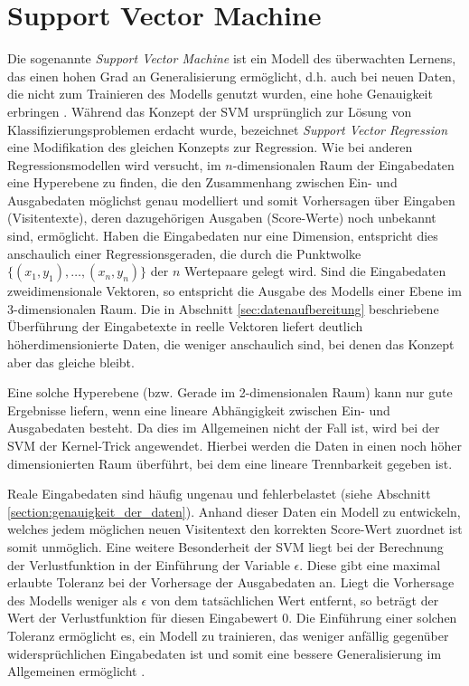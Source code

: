 \section{Support Vector Machine}
Die sogenannte \textit{Support Vector Machine} ist ein Modell des überwachten Lernens, das einen hohen Grad an Generalisierung ermöglicht, d.h. auch bei neuen Daten, die nicht zum Trainieren des Modells genutzt wurden, eine hohe Genauigkeit erbringen \citep{Awad2015}. Während das Konzept der SVM ursprünglich zur Lösung von Klassifizierungsproblemen erdacht wurde, bezeichnet \textit{Support Vector Regression} eine Modifikation des gleichen Konzepts zur Regression. Wie bei anderen Regressionsmodellen wird versucht, im $n$-dimensionalen Raum der Eingabedaten eine Hyperebene zu finden, die den Zusammenhang zwischen Ein- und Ausgabedaten möglichst genau modelliert und somit Vorhersagen über Eingaben (Visitentexte), deren dazugehörigen Ausgaben (Score-Werte) noch unbekannt sind, ermöglicht. Haben die Eingabedaten nur eine Dimension, entspricht dies anschaulich einer Regressionsgeraden, die durch die Punktwolke $\{(x_1, y_1), \dots, (x_n, y_n)\}$ der $n$ Wertepaare gelegt wird. Sind die Eingabedaten zweidimensionale Vektoren, so entspricht die Ausgabe des Modells einer Ebene im 3-dimensionalen Raum. Die in Abschnitt \ref{sec:datenaufbereitung} beschriebene Überführung der Eingabetexte in reelle Vektoren liefert deutlich höherdimensionierte Daten, die weniger anschaulich sind, bei denen das Konzept aber das gleiche bleibt.

Eine solche Hyperebene (bzw. Gerade im 2-dimensionalen Raum) kann nur gute Ergebnisse liefern, wenn eine lineare Abhängigkeit zwischen Ein- und Ausgabedaten besteht. Da dies im Allgemeinen nicht der Fall ist, wird bei der SVM der Kernel-Trick angewendet. Hierbei werden die Daten in einen noch höher dimensionierten Raum überführt, bei dem eine lineare Trennbarkeit gegeben ist.

Reale Eingabedaten sind häufig ungenau und fehlerbelastet (siehe Abschnitt \ref{section:genauigkeit_der_daten}). Anhand dieser Daten ein Modell zu entwickeln, welches jedem möglichen neuen Visitentext den korrekten Score-Wert zuordnet ist somit unmöglich. Eine weitere Besonderheit der SVM liegt bei der Berechnung der Verlustfunktion in der Einführung der Variable $\epsilon$. Diese gibt eine maximal erlaubte Toleranz bei der Vorhersage der Ausgabedaten an. Liegt die Vorhersage des Modells weniger als $\epsilon$ von dem tatsächlichen Wert entfernt, so beträgt der Wert der Verlustfunktion für diesen Eingabewert 0. Die Einführung einer solchen Toleranz ermöglicht es, ein Modell zu trainieren, das weniger anfällig gegenüber widersprüchlichen Eingabedaten ist und somit eine bessere Generalisierung im Allgemeinen ermöglicht \citep{Awad2015}.

